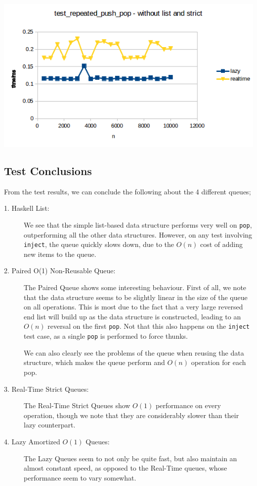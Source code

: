 \includegraphics{Graphs/test_repeated_push_pop_without_list.png}


\subsection{Test Conclusions}
 
From the test results, we can conclude the following about the 4 different queues;

\begin{description}
\item[1. Haskell List:]
We see that the simple list-based data structure performs very well on \texttt{pop}, outperforming all the other data structures.
However, on any test involving \texttt{inject}, the queue quickly slows down, due to the $O(n)$ cost of adding new items to the queue. 

\item[2. Paired O(1) Non-Reusable Queue:]
The Paired Queue shows some interesting behaviour.
First of all, we note that the data structure seems to be slightly linear in the size of the queue on all operations. This is most due to the fact that a very large reversed end list will build up as the data structure is constructed, leading to an $O(n)$ reversal on the first \texttt{pop}. Not that this also happens on the \texttt{inject} test case, as a single \texttt{pop} is performed to force thunks.

We can also clearly see the problems of the queue when reusing the data structure, which makes the queue perform and $O(n)$ operation for each pop.

\item[3. Real-Time Strict Queues:] 
The Real-Time Strict Queues show $O(1)$ performance on every operation, though we note that they are considerably slower than their lazy counterpart.

\item[4. Lazy Amortized $O(1)$ Queues:]
The Lazy Queues seem to not only be quite fast, but also maintain an almost constant speed, as opposed to the Real-Time queues, whose performance seem to vary somewhat.
\end{description}
